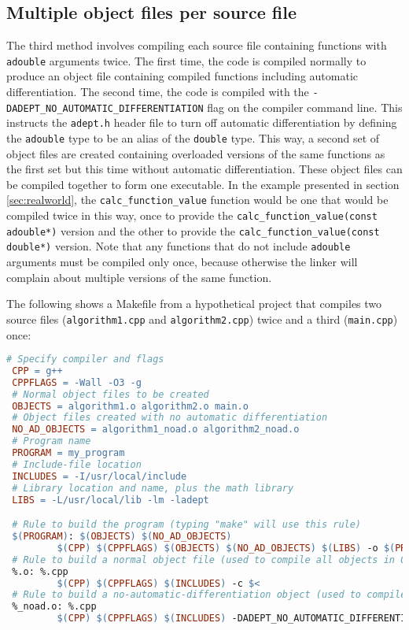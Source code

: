\documentclass[a4,oneside]{book}
\def\codesize{\small}
\def\code#1{{\codesize\texttt{#1}}}
\begin{document}
\subsection{Multiple object files per source file}
\label{sec:multipleobjects}
The third method involves compiling each source file containing
functions with \code{adouble} arguments twice.  The first time, the
code is compiled normally to produce an object file containing
compiled functions including automatic differentiation. The second
time, the code is compiled with the
\code{-DADEPT\_NO\_AUTOMATIC\_DIFFERENTIATION} flag on the compiler
command line. This instructs the \code{adept.h} header file to turn
off automatic differentiation by defining the \code{adouble} type to
be an alias of the \code{double} type. This way, a second set of
object files are created containing overloaded versions of the same
functions as the first set but this time without automatic
differentiation. These object files can be compiled together to form
one executable.  In the example presented in section
\ref{sec:realworld}, the \code{calc\_function\_value} function would
be one that would be compiled twice in this way, once to provide the
\code{calc\_function\_value(const adouble*)} version and the other to
provide the \code{calc\_function\_value(const double*)} version. Note
that any functions that do not include \code{adouble} arguments must
be compiled only once, because otherwise the linker will complain
about multiple versions of the same function.

The following shows a Makefile from a hypothetical project that
compiles two source files (\code{algorithm1.cpp} and
\code{algorithm2.cpp}) twice and a third (\code{main.cpp}) once:
%
\begin{lstlisting}[language=make]
 # Specify compiler and flags
 CPP = g++
 CPPFLAGS = -Wall -O3 -g
 # Normal object files to be created
 OBJECTS = algorithm1.o algorithm2.o main.o
 # Object files created with no automatic differentiation
 NO_AD_OBJECTS = algorithm1_noad.o algorithm2_noad.o
 # Program name
 PROGRAM = my_program
 # Include-file location
 INCLUDES = -I/usr/local/include
 # Library location and name, plus the math library
 LIBS = -L/usr/local/lib -lm -ladept

 # Rule to build the program (typing "make" will use this rule)
 $(PROGRAM): $(OBJECTS) $(NO_AD_OBJECTS)
         $(CPP) $(CPPFLAGS) $(OBJECTS) $(NO_AD_OBJECTS) $(LIBS) -o $(PROGRAM)
 # Rule to build a normal object file (used to compile all objects in OBJECTS)
 %.o: %.cpp
         $(CPP) $(CPPFLAGS) $(INCLUDES) -c $<
 # Rule to build a no-automatic-differentiation object (used to compile ones in NO_AD_OBJECTS)
 %_noad.o: %.cpp
         $(CPP) $(CPPFLAGS) $(INCLUDES) -DADEPT_NO_AUTOMATIC_DIFFERENTIATION -c $< -o $@
\end{lstlisting}
%
\end{document}
